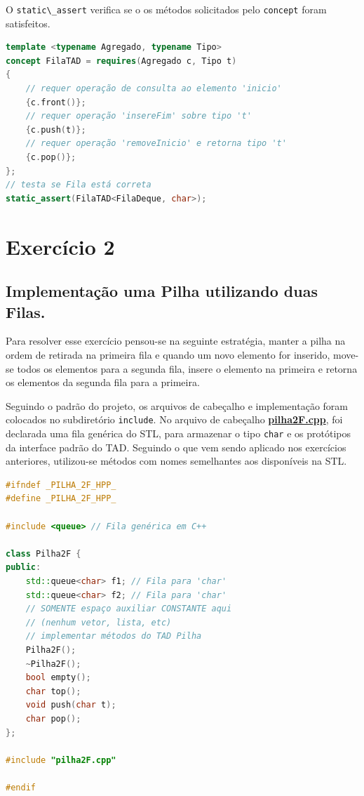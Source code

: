 \documentclass[
  brazilian,
  paper=a4,
  oneside  ,captions=tableheading
]{scrbook}
\newcommand{\passthrough}[1]{#1}
\begin{document}
O \passthrough{\lstinline!static\_assert!} verifica se o os métodos
solicitados pelo \passthrough{\lstinline!concept!} foram satisfeitos.

\begin{lstlisting}[language={C++}]
template <typename Agregado, typename Tipo>
concept FilaTAD = requires(Agregado c, Tipo t)
{
    // requer operação de consulta ao elemento 'inicio'
    {c.front()};
    // requer operação 'insereFim' sobre tipo 't'
    {c.push(t)};
    // requer operação 'removeInicio' e retorna tipo 't'
    {c.pop()};
};
// testa se Fila está correta
static_assert(FilaTAD<FilaDeque, char>);
\end{lstlisting}

\hypertarget{exercuxedcio-2}{%
\chapter{Exercício 2}\label{exercuxedcio-2}}

\hypertarget{implementauxe7uxe3o-uma-pilha-utilizando-duas-filas.}{%
\section{Implementação uma Pilha utilizando duas
Filas.}\label{implementauxe7uxe3o-uma-pilha-utilizando-duas-filas.}}

Para resolver esse exercício pensou-se na seguinte estratégia, manter a
pilha na ordem de retirada na primeira fila e quando um novo elemento
for inserido, move-se todos os elementos para a segunda fila, insere o
elemento na primeira e retorna os elementos da segunda fila para a
primeira.

Seguindo o padrão do projeto, os arquivos de cabeçalho e implementação
foram colocados no subdiretório \passthrough{\lstinline!include!}. No
arquivo de cabeçalho
\href{https://github.com/ecostadelle/lista_pilhas_filas/blob/main/include/pilha2F.cpp}{\textbf{pilha2F.cpp}},
foi declarada uma fila genérica do STL, para armazenar o tipo
\passthrough{\lstinline!char!} e os protótipos da interface padrão do
TAD. Seguindo o que vem sendo aplicado nos exercícios anteriores,
utilizou-se métodos com nomes semelhantes aos disponíveis na STL.

\begin{lstlisting}[language={C++}]
#ifndef _PILHA_2F_HPP_
#define _PILHA_2F_HPP_

#include <queue> // Fila genérica em C++

class Pilha2F {
public:
    std::queue<char> f1; // Fila para 'char'
    std::queue<char> f2; // Fila para 'char'
    // SOMENTE espaço auxiliar CONSTANTE aqui 
    // (nenhum vetor, lista, etc) 
    // implementar métodos do TAD Pilha
    Pilha2F();
    ~Pilha2F();
    bool empty();
    char top();
    void push(char t);
    char pop();
};

#include "pilha2F.cpp"

#endif
\end{lstlisting}
\end{document}
